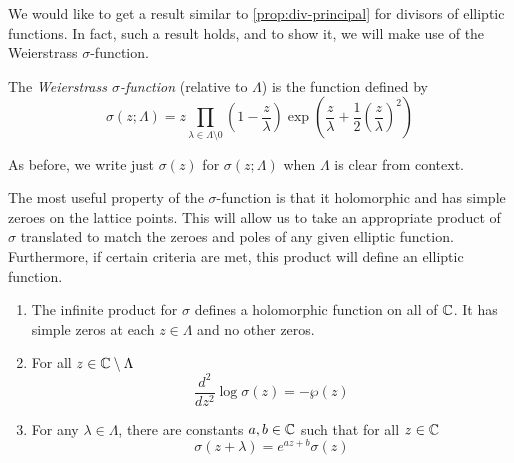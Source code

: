 We would like to get a result similar to \ref{prop:div-principal} for
divisors of elliptic functions. In fact, such a result holds, and to show
it, we will make use of the Weierstrass $\sigma$-function.

\begin{definition}
	The \emph{Weierstrass $\sigma$-function} (relative to $\Lambda$) is the
	function defined by
	\begin{equation*}
		\sigma(z; \Lambda) = z \prod_{\lambda\in\Lambda\setminus 0}
		\left(1 - \frac{z}{\lambda}\right)
		\exp\left(\frac{z}{\lambda} + \frac{1}{2}\left(\frac{z}{\lambda}\right)^2\right)
	\end{equation*}
\end{definition}

\begin{notation}
	As before, we write just $\sigma(z)$ for $\sigma(z; \Lambda)$ when $\Lambda$
	is clear from context.
\end{notation}


The most useful property of the $\sigma$-function is that it holomorphic
and has simple zeroes on the lattice points. This will allow us to take
an appropriate product of $\sigma$ translated to match the zeroes and poles
of any given elliptic function. Furthermore, if certain criteria are met,
this product will define an elliptic function.

\begin{lemma}
	\label{lem:sigma-properties}
	\begin{enumerate}[label=(\alph*)]
		\item The infinite product for $\sigma$ defines a holomorphic function
			on all of $\mathbb{C}$. It has simple zeros at each $z \in \Lambda$
			and no other zeros.
		\item For all $z \in \mathbb{C}\setminus \Lambda$
			\begin{equation*}
				\frac{d^2}{dz^2}\log\sigma(z) = -\wp(z)
			\end{equation*}
		\item For any $\lambda \in \Lambda$, there are constants
			$a, b \in \mathbb{C}$ such that for all $z\in \mathbb{C}$
			\begin{equation*}
				\sigma(z + \lambda) = e^{az + b}\sigma(z)
			\end{equation*}
	\end{enumerate}
\end{lemma}

